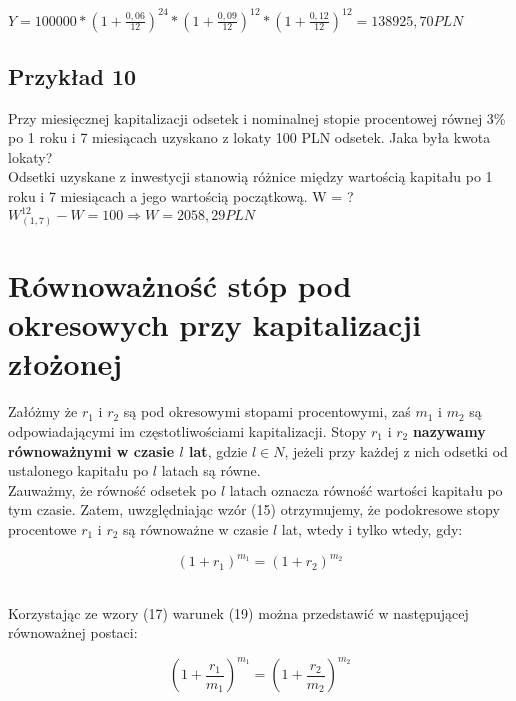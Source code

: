 \documentclass{article}
\begin{document}
$ Y = 100 000 * (1+\frac{0,06}{12})^{24} * (1+\frac{0,09}{12})^{12} * (1+\frac{0,12}{12})^{12} = 138 925,70  PLN $\\

\subsection{Przykład 10}
Przy miesięcznej kapitalizacji odsetek i nominalnej stopie procentowej równej 3\% po 1 roku i 7 miesiącach uzyskano z lokaty 100 PLN odsetek. Jaka była kwota lokaty?\\

Odsetki uzyskane z inwestycji stanowią różnice między wartością kapitału po 1 roku i 7 miesiącach a jego wartością początkową. W = ?\\

$ W^{12}_{(1,7)} - W = 100  \Rightarrow  W = 2 058,29 PLN $\\

%
%

\section{Równoważność stóp pod okresowych przy kapitalizacji złożonej}

Załóżmy że $ r_1 $ i $ r_2 $ są pod okresowymi stopami procentowymi, zaś $ m_1 $ i $ m_2 $ są odpowiadającymi im częstotliwościami kapitalizacji. Stopy $ r_1 $ i $ r_2 $ \textbf{nazywamy równoważnymi w czasie $ l $ lat}, gdzie $ l \in N $, jeżeli przy każdej z nich odsetki od ustalonego kapitału po $ l $ latach są równe.\\


Zauważmy, że równość odsetek po $ l $ latach oznacza równość wartości kapitału po tym czasie. Zatem, uwzględniając wzór (15) otrzymujemy, że podokresowe stopy procentowe $ r_1 $ i $ r_2 $ są równoważne w czasie $ l $ lat, wtedy i tylko wtedy, gdy:

\begin{center}
	\begin{equation}
		(1 + r_1)^{m_1} = (1 + r_2)^{m_2}
	\end{equation}
\end{center}\\

Korzystając ze wzory (17) warunek (19) można przedstawić w następującej równoważnej postaci:

\begin{center}
	\begin{equation}
		(1 + \frac{r_1}{m_1})^{m_1} = (1 + \frac{r_2}{m_2})^{m_2}
	\end{equation}
\end{center}\\
\end{document}
